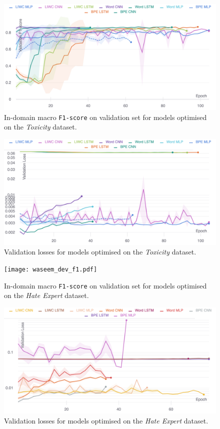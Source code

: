 \begin{figure}  
    \centering  
    \includegraphics[width=\textwidth]{wulczyn_dev_f1.pdf}  
    \caption{In-domain macro \texttt{F1-score} on validation set for models optimised on the \textit{Toxicity} dataset.}  
    \label{fig:wulczyn_dev_f1}  
\end{figure}  
\begin{figure}  
    \centering  
    \includegraphics[width=\textwidth]{wulczyn_dev_loss_stderr_logscale.pdf}  
    \caption{Validation losses for models optimised on the \textit{Toxicity} dataset.}  
    \label{fig:wulczyn_dev_loss}  
\end{figure}  
  
\begin{figure}  
    \centering  
    \texttt{[image: waseem\_dev\_f1.pdf]}  
    \caption{In-domain macro \texttt{F1-score} on validation set for models optimised on the \textit{Hate Expert} dataset.}  
    \label{fig:waseem_dev_f1}  
\end{figure}  
\begin{figure}  
    \centering  
    \includegraphics[width=\textwidth]{waseem_dev_loss_stderr_logscale.pdf}  
    \caption{Validation losses for models optimised on the \textit{Hate Expert} dataset.}  
    \label{fig:waseem_dev_loss}  
\end{figure}  
  
